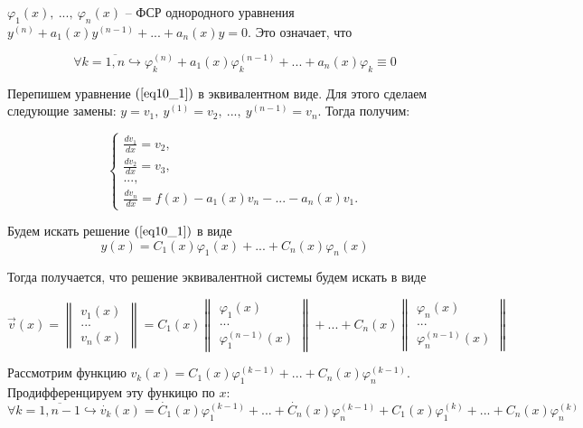 $\varphi_1(x),~...,~\varphi_n(x)$ -- ФСР однородного уравнения $y^{(n)} + a_1(x)y^{(n-1)} + ... + a_n(x)y = 0$. Это означает, что 

\begin{equation}\label{eq10_2}
\forall k = \overline{1, n} \hookrightarrow \varphi_k^{(n)} + a_1(x)\varphi_k^{(n-1)} + ... + a_n(x)\varphi_k \equiv 0
\end{equation}

Перепишем уравнение $(\ref{eq10_1})$ в эквивалентном виде. Для этого сделаем следующие замены: $y = v_1, ~y^{(1)} = v_2,~..., ~y^{(n-1)} = v_n$. Тогда получим:

\begin{equation}\label{eq10_3}
 \begin{cases}
   \frac{dv_1}{dx} = v_2, 
   \\
   \frac{dv_2}{dx} = v_3,
   \\
   ...,
   \\
   \frac{dv_n}{dx} = f(x) - a_1(x)v_n - ... - a_n(x)v_1.
 \end{cases}
\end{equation}

Будем искать решение $(\ref{eq10_1})$ в виде
\[y(x) = C_1(x)\varphi_1(x) + ... + C_n(x)\varphi_n(x)\]

Тогда получается, что решение эквивалентной системы будем искать в виде

\begin{equation}
\overrightarrow{v}(x) = 
	\begin{Vmatrix}
  		v_1(x)\\
  		...\\
  		v_n(x)
	\end{Vmatrix} = C_1(x)
		\begin{Vmatrix}
  			\varphi_1(x)\\
  			...\\
  			\varphi_1^{(n-1)}(x)
		\end{Vmatrix} + ... + C_n(x)
			\begin{Vmatrix}
  				\varphi_n(x)\\
  				...\\
  				\varphi_n^{(n-1)}(x)
			\end{Vmatrix}
\end{equation}

Рассмотрим функцию $v_k(x) = C_1(x)\varphi_1^{(k-1)} + ... + C_n(x)\varphi_n^{(k-1)}$. Продифференцируем эту функицю по $x$:
\begin{equation}
\forall k =\overline{1, n-1} \hookrightarrow \dot{v_k}(x) = \dot{C_1}(x)\varphi_1^{(k-1)} + ... + \dot{C_n}(x)\varphi_n^{(k-1)} + C_1(x)\varphi_1^{(k)} + ... + C_n(x)\varphi_n^{(k)}
\end{equation}

